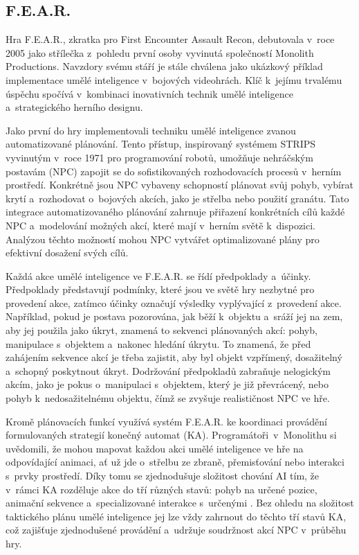 \subsection{F.E.A.R.}
Hra F.E.A.R.\cite{DD1}\cite{DD2}, zkratka pro First Encounter Assault Recon, debutovala v~roce 2005 jako střílečka z~pohledu první osoby vyvinutá společností Monolith Productions. Navzdory svému stáří je stále chválena jako ukázkový příklad implementace umělé inteligence v~bojových videohrách. Klíč k~jejímu trvalému úspěchu spočívá v~kombinaci inovativních technik umělé inteligence a~strategického herního designu.

Jako první do hry implementovali techniku umělé inteligence zvanou automatizované plánování. Tento přístup, inspirovaný systémem STRIPS\cite{FikesWinter1971} vyvinutým v~roce 1971 pro programování robotů, umožňuje nehráčským postavám (NPC) zapojit se do sofistikovaných rozhodovacích procesů v~herním prostředí. Konkrétně jsou NPC vybaveny schopností plánovat svůj pohyb, vybírat krytí a~rozhodovat o~bojových akcích, jako je střelba nebo použití granátu. Tato integrace automatizovaného plánování zahrnuje přiřazení konkrétních cílů každé NPC a~modelování možných akcí, které mají v~herním světě k~dispozici. Analýzou těchto možností mohou NPC vytvářet optimalizované plány pro efektivní dosažení svých cílů.

Každá akce umělé inteligence ve F.E.A.R. se řídí předpoklady a~účinky. Předpoklady představují podmínky, které jsou ve světě hry nezbytné pro provedení akce, zatímco účinky označují výsledky vyplývající z~provedení akce. Například, pokud je postava pozorována, jak běží k~objektu a~sráží jej na zem, aby jej použila jako úkryt, znamená to sekvenci plánovaných akcí: pohyb, manipulace s~objektem a~nakonec hledání úkrytu. To znamená, že před zahájením sekvence akcí je třeba zajistit, aby byl objekt vzpřímený, dosažitelný a~schopný poskytnout úkryt. Dodržování předpokladů zabraňuje nelogickým akcím, jako je pokus o~manipulaci s~objektem, který je již převrácený, nebo pohyb k~nedosažitelnému objektu, čímž se zvyšuje realističnost NPC ve hře.

\newpage

Kromě plánovacích funkcí využívá systém F.E.A.R. ke koordinaci provádění formulovaných strategií konečný automat (KA). Programátoři~v~Monolithu si uvědomili, že mohou mapovat každou akci umělé inteligence ve hře na odpovídající animaci, ať už jde o~střelbu ze zbraně, přemisťování nebo interakci s~prvky prostředí. Díky tomu se zjednodušuje složitost chování AI tím, že v~rámci KA rozděluje akce do tří různých stavů: pohyb na určené pozice, animační sekvence a~specializované interakce s~určenými . Bez ohledu na složitost taktického plánu umělé inteligence jej lze vždy zahrnout do těchto tří stavů KA, což zajišťuje zjednodušené provádění a~udržuje soudržnost akcí NPC v~průběhu hry.


